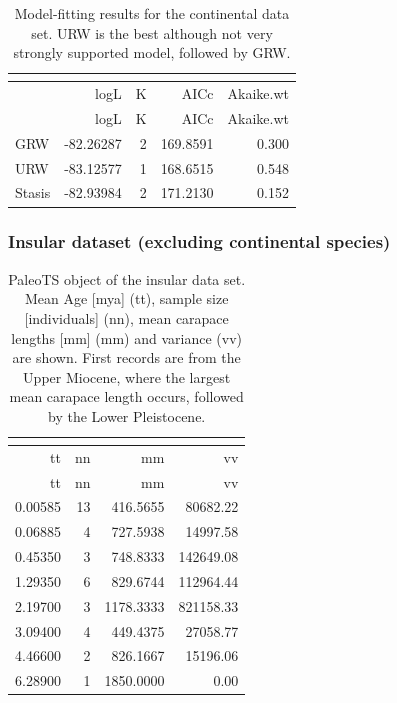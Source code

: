 \begin{longtable}[]{@{}lrrrr@{}}
	\caption[Model fits for the continental data set]{Model-fitting results for the continental data set. URW is the best although not very strongly supported model, followed by GRW.}
	\label{tab:pTSCEM}\tabularnewline
	\toprule
	& logL & K & AICc & Akaike.wt\tabularnewline
	\midrule
	\endfirsthead
	\toprule
	& logL & K & AICc & Akaike.wt\tabularnewline
	\midrule
	\endhead
	GRW & -82.26287 & 2 & 169.8591 & 0.300\tabularnewline
	URW & -83.12577 & 1 & 168.6515 & 0.548\tabularnewline
	Stasis & -82.93984 & 2 & 171.2130 & 0.152\tabularnewline
	\bottomrule
\end{longtable}


\FloatBarrier

\subsubsection{Insular dataset (excluding
	continental species)}\label{insular-excluding-continental}

\begin{longtable}[]{@{}rrrr@{}}
	\caption[PaleoTS object of insular \T]{PaleoTS object of the insular data set. Mean Age [mya] (tt), sample size [individuals] (nn), mean carapace lengths [mm] (mm) and variance (vv) are shown. First records are from the Upper Miocene, where the largest mean carapace length occurs, followed by the Lower Pleistocene.}
	\label{tab:pTSI}\tabularnewline
	\toprule
	tt & nn & mm & vv\tabularnewline
	\midrule
	\endfirsthead
	\toprule
	tt & nn & mm & vv\tabularnewline
	\midrule
	\endhead
	0.00585 & 13 & 416.5655 & 80682.22\tabularnewline
	0.06885 & 4 & 727.5938 & 14997.58\tabularnewline
	0.45350 & 3 & 748.8333 & 142649.08\tabularnewline
	1.29350 & 6 & 829.6744 & 112964.44\tabularnewline
	2.19700 & 3 & 1178.3333 & 821158.33\tabularnewline
	3.09400 & 4 & 449.4375 & 27058.77\tabularnewline
	4.46600 & 2 & 826.1667 & 15196.06\tabularnewline
	6.28900 & 1 & 1850.0000 & 0.00\tabularnewline
	\bottomrule
\end{longtable}

